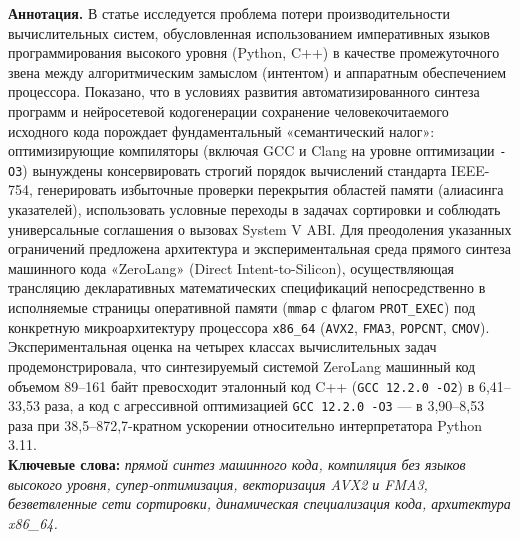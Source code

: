 \documentclass[11pt,a4paper]{article}
\begin{document}
\vspace{4pt}
\noindent\colorbox{primary!5}{%
\parbox{\dimexpr\textwidth-2\fboxsep\relax}{%
\vspace{4pt}
\textbf{\color{primary}Аннотация.} В статье исследуется проблема потери производительности вычислительных систем, обусловленная использованием императивных языков программирования высокого уровня (Python, C++) в качестве промежуточного звена между алгоритмическим замыслом (интентом) и аппаратным обеспечением процессора. Показано, что в условиях развития автоматизированного синтеза программ и нейросетевой кодогенерации сохранение человекочитаемого исходного кода порождает фундаментальный «семантический налог»: оптимизирующие компиляторы (включая GCC и Clang на уровне оптимизации \texttt{-O3}) вынуждены консервировать строгий порядок вычислений стандарта IEEE-754, генерировать избыточные проверки перекрытия областей памяти (алиасинга указателей), использовать условные переходы в задачах сортировки и соблюдать универсальные соглашения о вызовах System V ABI. Для преодоления указанных ограничений предложена архитектура и экспериментальная среда прямого синтеза машинного кода «ZeroLang» (Direct Intent-to-Silicon), осуществляющая трансляцию декларативных математических спецификаций непосредственно в исполняемые страницы оперативной памяти (\texttt{mmap} с флагом \texttt{PROT\_EXEC}) под конкретную микроархитектуру процессора \texttt{x86\_64} (\texttt{AVX2}, \texttt{FMA3}, \texttt{POPCNT}, \texttt{CMOV}). Экспериментальная оценка на четырех классах вычислительных задач продемонстрировала, что синтезируемый системой ZeroLang машинный код объемом 89–161 байт превосходит эталонный код C++ (\texttt{GCC 12.2.0 -O2}) в 6,41–33,53 раза, а код с агрессивной оптимизацией \texttt{GCC 12.2.0 -O3} — в 3,90–8,53 раза при 38,5–872,7-кратном ускорении относительно интерпретатора Python 3.11.\\[4pt]
\textbf{\color{primary}Ключевые слова:} \textit{прямой синтез машинного кода, компиляция без языков высокого уровня, супер-оптимизация, векторизация AVX2 и FMA3, безветвленные сети сортировки, динамическая специализация кода, архитектура x86\_64.}\\[6pt]
}}
\end{document}
